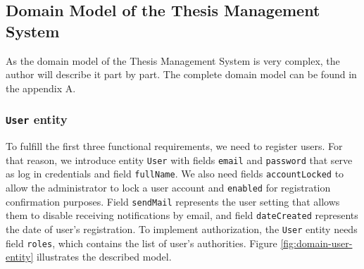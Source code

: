 \subsection{Domain Model of the Thesis Management System}

As the domain model of the Thesis Management System is very complex, the author will describe it part by part. The complete domain model can be found in the appendix A.

\subsubsection{\textbf{\texttt{User} entity}}

To fulfill the first three functional requirements, we need to register users. For that reason, we introduce entity \texttt{User} with fields \texttt{email} and \texttt{password} that serve as log in credentials and field \texttt{fullName}. We also need fields \texttt{accountLocked} to allow the administrator to lock a user account and \texttt{enabled} for registration confirmation purposes. Field \texttt{sendMail} represents the user setting that allows them to disable receiving notifications by email, and field \texttt{dateCreated} represents the date of user's registration. To implement authorization, the \texttt{User} entity needs field \texttt{roles}, which contains the list of user's authorities. Figure \ref{fig:domain-user-entity} illustrates the described model.

